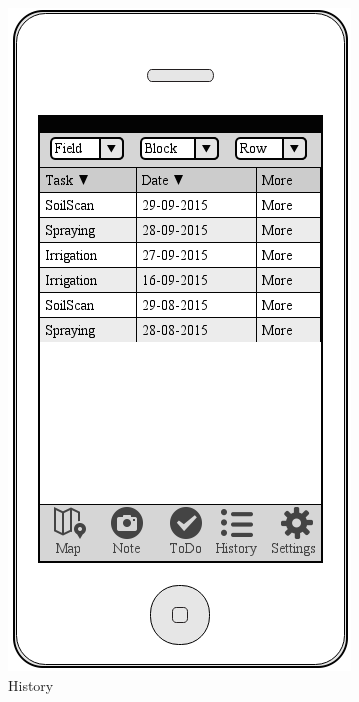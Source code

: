 \documentclass[12pt]{article}
\begin{document}
\begin{figure}[ht]
	\includegraphics[width=\linewidth, height=0.4\textheight, keepaspectratio=true]{mockups/History.png}
	\caption{History}
	\endminipage\hfill
\end{figure}
\end{document}
